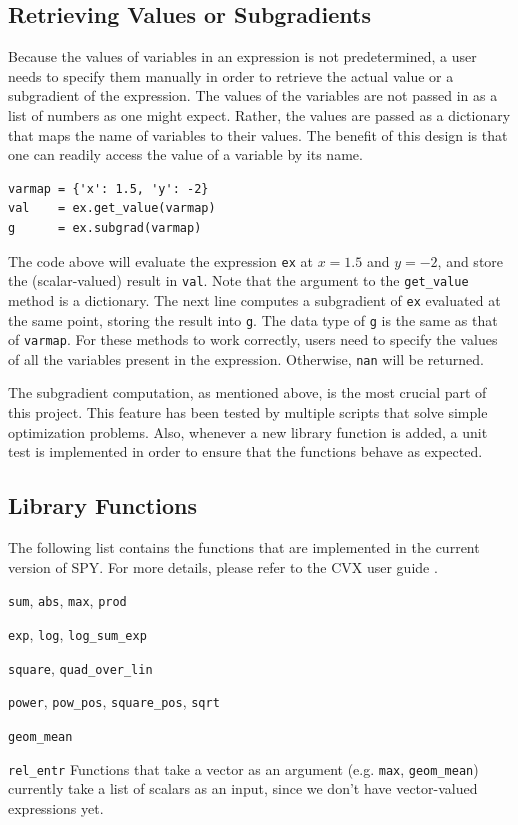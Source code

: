 \documentclass[12pt]{article}
\begin{document}
\subsection{Retrieving Values or Subgradients}
Because the values of variables in an expression is not predetermined, a user needs to specify them manually in order to retrieve the actual value or a subgradient of the expression. The values of the variables are not passed in as a list of numbers as one might expect. Rather, the values are passed as a dictionary that maps the name of variables to their values. The benefit of this design is that one can readily access the value of a variable by its name.

\begin{verbatim}
varmap = {'x': 1.5, 'y': -2}
val    = ex.get_value(varmap)
g      = ex.subgrad(varmap)
\end{verbatim}

The code above will evaluate the expression \verb'ex' at $x=1.5$ and $y=-2$, and store the (scalar-valued) result in \verb'val'. Note that the argument to the \verb'get_value' method is a dictionary. The next line computes a subgradient of \verb'ex' evaluated at the same point, storing the result into \verb'g'. The data type of \verb'g' is the same as that of \verb'varmap'. For these methods to work correctly, users need to specify the values of all the variables present in the expression. Otherwise, \verb'nan' will be returned.

The subgradient computation, as mentioned above, is the most crucial part of this project. This feature has been tested by multiple scripts that solve simple optimization problems. Also, whenever a new library function is added, a unit test is implemented in order to ensure that the functions behave as expected.

\subsection{Library Functions}
The following list contains the functions that are implemented in the current version of SPY. For more details, please refer to the CVX user guide \cite{guide}.
\BIT
\item \verb'sum', \verb'abs', \verb'max', \verb'prod'
\item \verb'exp', \verb'log', \verb'log_sum_exp'
\item \verb'square', \verb'quad_over_lin'
\item \verb'power', \verb'pow_pos', \verb'square_pos', \verb'sqrt'
\item \verb'geom_mean'
\item \verb'rel_entr'
\EIT
Functions that take a vector as an argument (e.g. \verb'max', \verb'geom_mean') currently take a list of scalars as an input, since we don't have vector-valued expressions yet.
\end{document}

